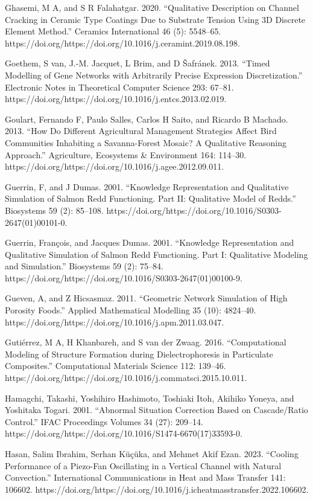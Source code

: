 \documentclass[utf8]{gradu3}
\begin{document}
Ghasemi, M A, and S R Falahatgar. 2020. “Qualitative Description on Channel Cracking in Ceramic Type Coatings Due to Substrate Tension Using 3D Discrete Element Method.” Ceramics International 46 (5): 5548–65. https://doi.org/https://doi.org/10.1016/j.ceramint.2019.08.198.

Goethem, S van, J.-M. Jacquet, L Brim, and D Šafránek. 2013. “Timed Modelling of Gene Networks with Arbitrarily Precise Expression Discretization.” Electronic Notes in Theoretical Computer Science 293: 67–81. https://doi.org/https://doi.org/10.1016/j.entcs.2013.02.019.

Goulart, Fernando F, Paulo Salles, Carlos H Saito, and Ricardo B Machado. 2013. “How Do Different Agricultural Management Strategies Affect Bird Communities Inhabiting a Savanna-Forest Mosaic? A Qualitative Reasoning Approach.” Agriculture, Ecosystems \& Environment 164: 114–30. https://doi.org/https://doi.org/10.1016/j.agee.2012.09.011.

Guerrin, F, and J Dumas. 2001. “Knowledge Representation and Qualitative Simulation of Salmon Redd Functioning. Part II: Qualitative Model of Redds.” Biosystems 59 (2): 85–108. https://doi.org/https://doi.org/10.1016/S0303-2647(01)00101-0.

Guerrin, François, and Jacques Dumas. 2001. “Knowledge Representation and Qualitative Simulation of Salmon Redd Functioning. Part I: Qualitative Modeling and Simulation.” Biosystems 59 (2): 75–84. https://doi.org/https://doi.org/10.1016/S0303-2647(01)00100-9.

Gueven, A, and Z Hicsasmaz. 2011. “Geometric Network Simulation of High Porosity Foods.” Applied Mathematical Modelling 35 (10): 4824–40. https://doi.org/https://doi.org/10.1016/j.apm.2011.03.047.

Gutiérrez, M A, H Khanbareh, and S van der Zwaag. 2016. “Computational Modeling of Structure Formation during Dielectrophoresis in Particulate Composites.” Computational Materials Science 112: 139–46. https://doi.org/https://doi.org/10.1016/j.commatsci.2015.10.011.

Hamagchi, Takashi, Yoshihiro Hashimoto, Toshiaki Itoh, Akihiko Yoneya, and Yoshitaka Togari. 2001. “Abnormal Situation Correction Based on Cascade/Ratio Control.” IFAC Proceedings Volumes 34 (27): 209–14. https://doi.org/https://doi.org/10.1016/S1474-6670(17)33593-0.

Hasan, Salim Ibrahim, Serhan Küçüka, and Mehmet Akif Ezan. 2023. “Cooling Performance of a Piezo-Fan Oscillating in a Vertical Channel with Natural Convection.” International Communications in Heat and Mass Transfer 141: 106602. https://doi.org/https://doi.org/10.1016/j.icheatmasstransfer.2022.106602.
\end{document}
